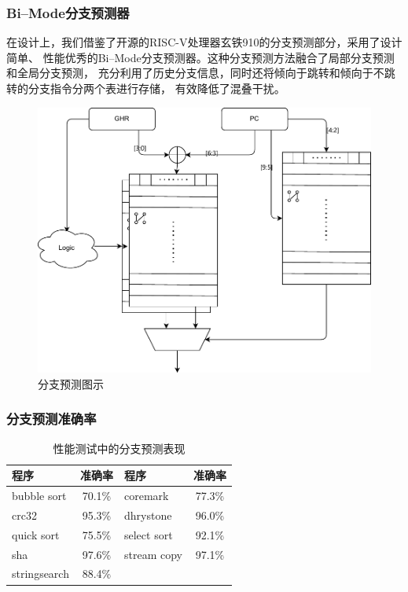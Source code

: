 \documentclass{beamer}
\begin{document}
\begin{frame}
    \frametitle{Bi--Mode分支预测器}

    \begin{minipage}[c]{0.45\linewidth}
        在设计上，我们借鉴了开源的RISC-V处理器玄铁910的分支预测部分，采用了设计简单、
        性能优秀的Bi--Mode分支预测器。这种分支预测方法融合了局部分支预测和全局分支预测，
        充分利用了历史分支信息，同时还将倾向于跳转和倾向于不跳转的分支指令分两个表进行存储，
        有效降低了混叠干扰。
    \end{minipage}\hfill
    \begin{minipage}{0.5\linewidth}
        \medskip
        \begin{figure}
            \centering
            \includegraphics[width=\linewidth]{pic/branch-predict.pdf}
            \caption{分支预测图示}
        \end{figure}
    \end{minipage}

\end{frame}

\begin{frame}
    \frametitle{分支预测准确率}
    \begin{table}
        \centering
        \caption{性能测试中的分支预测表现}
        \begin{tabular}{lc|lc}
            \toprule
            程序 & 准确率 & 程序 & 准确率\\
            \midrule
            bubble sort & 70.1\% & coremark & 77.3\% \\
            crc32 & 95.3\% & dhrystone & 96.0\% \\
            quick sort & 75.5\% & select sort & 92.1\% \\
            sha & 97.6\% & stream copy & 97.1\% \\
            stringsearch & 88.4\% \\
            \bottomrule
        \end{tabular}
    \end{table}
\end{frame}
\end{document}
